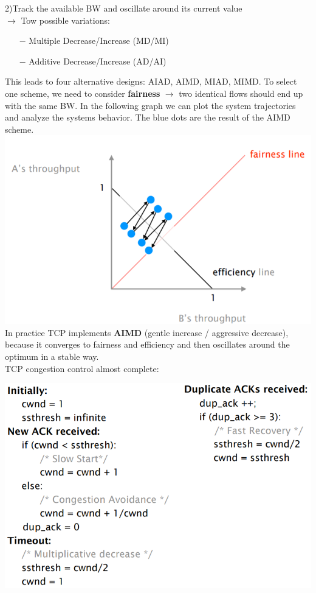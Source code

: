 \documentclass[a4paper, fontsize=8pt, landscape, DIV=1]{scrartcl}
\begin{document}
\begin{multicols*}{4}
		2)Track the available BW and oscillate around its current value\\
		$\rightarrow$ Tow possible variations: 
		\begin{itemize}[noitemsep]
			\item[$-$] Multiple Decrease/Increase (MD/MI)
			\item[$-$] Additive Decrease/Increase (AD/AI)
		\end{itemize} 
		This leads to four alternative designs: AIAD, AIMD, MIAD, MIMD. To select one scheme, we need to consider \textbf{fairness} $\rightarrow$ two identical flows should end up with the same BW. In the following graph we can plot the system trajectories and analyze the systems behavior. The blue dots are the result of the AIMD scheme.\\
		\includegraphics[width=\columnwidth]{images/Transport_Layer/trajectory_plot.png}
		In practice TCP implements \textbf{AIMD} (gentle increase / aggressive decrease), because it converges to fairness and efficiency and then oscillates around the optimum in a stable way.\\
		TCP congestion control almost complete:
		\vspace{0.1cm}
		\begin{center}
			\includegraphics[width=0.9\columnwidth]{images/Transport_Layer/congestion_code.png}

\end{center}
\end{multicols*}
\end{document}
